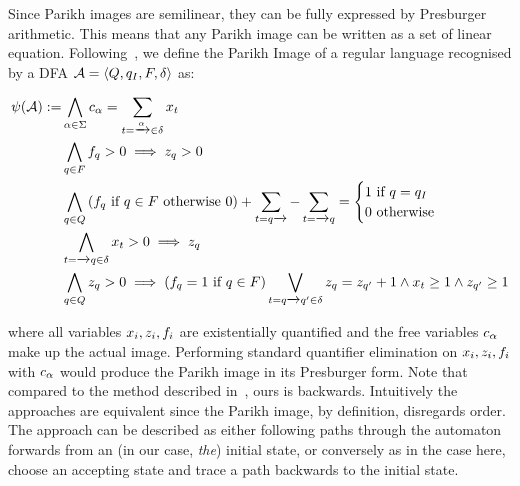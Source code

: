 \documentclass[acmsmall,review,anonymous]{acmart}\settopmatter{printfolios=true,printccs=false,printacmref=true}
\theoremstyle{definition}
\begin{document}
Since Parikh images are semilinear, they can be fully expressed by Presburger
arithmetic. This means that any Parikh image can be written as a set of linear
equation. Following~\cite{generate-parikh-image}, we define the Parikh Image of
a regular language recognised by a DFA $\mathcal{A} = \left\langle Q, q_I, F, \delta\right\rangle$ as:

\begin{equation}
\begin{aligned}
\ParikhMap(\Automaton) := 
& \AndComp{\Letter \in \Alphabet}{\LetterVar_{\Letter} = \sum_{\Transition = \FromLabelTo{}{\Letter}{} \in \Transitions} \TransitionVar_{\Transition}
}\\
& \AndComp{\State \in \AcceptingStates}{\FinalStateVar_{\State} > 0 \implies \StateVar_{\State} > 0}\\
& \AndComp{\State \in \States}{
  \left(\FinalStateVar_{\State} \text{ if } \State \in \AcceptingStates \text{ otherwise } 0 \right) +
  \sum_{\Transition = \FromLabelTo{\State}{}{}} - \sum_{\Transition = \FromLabelTo{}{}{\State}}
= \begin{cases}
    1 \text{  if $\State = \InitialState$} \\
    0 \text{ otherwise}
  \end{cases}
}\\
& \AndComp{\Transition = \FromLabelTo{}{}{\State} \in \Transitions}{
  \TransitionVar_{\Transition} > 0 \implies \StateVar_{\State}
} \\
& \AndComp{\State \in \States}{
  \StateVar_{\State} > 0 \implies
  \left(\FinalStateVar_{\State} = 1 \text{ if } \State \in \AcceptingStates\right) \OrComp{\Transition = \FromLabelTo{\State}{}{\State'} \in \Transitions}{
    \StateVar_{\State} = \StateVar_{\State'} + 1 \land 
    \TransitionVar_{\Transition} \geq 1 \land
  \StateVar_{\State'} \geq 1
    }
}
\end{aligned}
\label{eq:generate-parikh}
\end{equation}

where all variables $x_i, z_i, f_i$ are
existentially quantified and the free variables $c_\alpha$ make up the
actual image. Performing standard quantifier elimination on $x_i,
z_i, f_i$ with $c_\alpha$ would produce the
Parikh image in its Presburger form. Note that compared to the method described
in~\cite{generate-parikh-image}, ours is backwards. Intuitively the approaches
are equivalent since the Parikh image, by definition, disregards order. The
approach can be described as either following paths through the automaton
forwards from an (in our case, \emph{the}) initial state, or conversely as in
the case here, choose an accepting state and trace a path backwards to the
initial state. 
\end{document}
